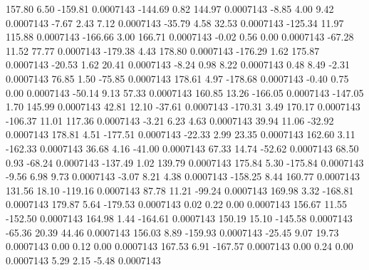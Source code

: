       157.80        6.50     -159.81     0.0007143
     -144.69        0.82      144.97     0.0007143
       -8.85        4.00        9.42     0.0007143
       -7.67        2.43        7.12     0.0007143
      -35.79        4.58       32.53     0.0007143
     -125.34       11.97      115.88     0.0007143
     -166.66        3.00      166.71     0.0007143
       -0.02        0.56        0.00     0.0007143
      -67.28       11.52       77.77     0.0007143
     -179.38        4.43      178.80     0.0007143
     -176.29        1.62      175.87     0.0007143
      -20.53        1.62       20.41     0.0007143
       -8.24        0.98        8.22     0.0007143
        0.48        8.49       -2.31     0.0007143
       76.85        1.50      -75.85     0.0007143
      178.61        4.97     -178.68     0.0007143
       -0.40        0.75        0.00     0.0007143
      -50.14        9.13       57.33     0.0007143
      160.85       13.26     -166.05     0.0007143
     -147.05        1.70      145.99     0.0007143
       42.81       12.10      -37.61     0.0007143
     -170.31        3.49      170.17     0.0007143
     -106.37       11.01      117.36     0.0007143
       -3.21        6.23        4.63     0.0007143
       39.94       11.06      -32.92     0.0007143
      178.81        4.51     -177.51     0.0007143
      -22.33        2.99       23.35     0.0007143
      162.60        3.11     -162.33     0.0007143
       36.68        4.16      -41.00     0.0007143
       67.33       14.74      -52.62     0.0007143
       68.50        0.93      -68.24     0.0007143
     -137.49        1.02      139.79     0.0007143
      175.84        5.30     -175.84     0.0007143
       -9.56        6.98        9.73     0.0007143
       -3.07        8.21        4.38     0.0007143
     -158.25        8.44      160.77     0.0007143
      131.56       18.10     -119.16     0.0007143
       87.78       11.21      -99.24     0.0007143
      169.98        3.32     -168.81     0.0007143
      179.87        5.64     -179.53     0.0007143
        0.02        0.22        0.00     0.0007143
      156.67       11.55     -152.50     0.0007143
      164.98        1.44     -164.61     0.0007143
      150.19       15.10     -145.58     0.0007143
      -65.36       20.39       44.46     0.0007143
      156.03        8.89     -159.93     0.0007143
      -25.45        9.07       19.73     0.0007143
        0.00        0.12        0.00     0.0007143
      167.53        6.91     -167.57     0.0007143
        0.00        0.24        0.00     0.0007143
        5.29        2.15       -5.48     0.0007143
